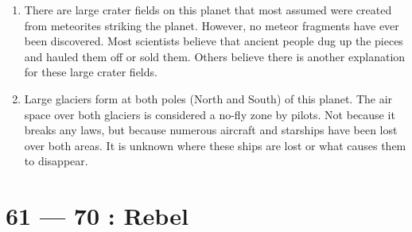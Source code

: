\documentclass{article}
\begin{document}
\begin{enumerate}
	\item There are large crater fields on this planet that most assumed were created from meteorites striking the planet. However, no meteor fragments have ever been discovered. Most scientists believe that ancient people dug up the pieces and hauled them off or sold them. Others believe there is another explanation for these large crater fields.
	\item Large glaciers form at both poles (North and South) of this planet. The air space over both glaciers is considered a no-fly zone by pilots. Not because it breaks any laws, but because numerous aircraft and starships have been lost over both areas. It is unknown where these ships are lost or what causes them to disappear.
\end{enumerate}
\section*{61 --- 70 : Rebel}
\end{document}
